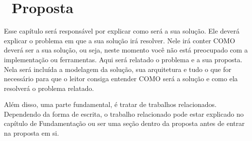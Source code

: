 \chapter{~Proposta}\label{chp:PROPOSTA}

Esse capítulo será responsável por explicar como será a sua solução.
Ele deverá explicar o problema em que a sua solução irá resolver.
Nele irá conter COMO deverá ser a sua solução, ou seja, neste momento você não está preocupado com a implementação ou ferramentas.
Aqui será relatado o problema e a sua proposta. 
Nela será incluída a modelagem da solução, sua arquitetura e tudo o que for necessário para que o leitor consiga entender COMO será a solução e como ela resolverá o problema relatado.

Além disso, uma parte fundamental, é tratar de trabalhos relacionados. Dependendo da forma de escrita, o trabalho relacionado pode estar explicado no capítulo de Fundamentação ou ser uma seção dentro da proposta antes de entrar na proposta em si.